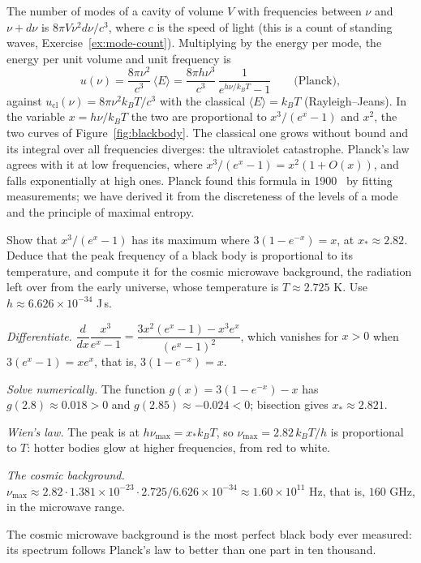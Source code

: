 The number of modes of a cavity of volume $V$ with frequencies between $\nu$ and $\nu+d\nu$ is $8\pi V\nu^2d\nu/c^3$, where $c$ is the speed of light (this is a count of standing waves, Exercise~\ref{ex:mode-count}). Multiplying by the energy per mode, the energy per unit volume and unit frequency is
\[
  u(\nu)=\frac{8\pi\nu^2}{c^3}\,\langle E\rangle=\frac{8\pi h\nu^3}{c^3}\,\frac1{e^{h\nu/k_BT}-1}\qquad\text{(Planck)},
\]
against $u_{\mathrm{cl}}(\nu)=8\pi\nu^2k_BT/c^3$ with the classical $\langle E\rangle=k_BT$ (Rayleigh--Jeans). In the variable $x=h\nu/k_BT$ the two are proportional to $x^3/(e^x-1)$ and $x^2$, the two curves of Figure~\ref{fig:blackbody}. The classical one grows without bound and its integral over all frequencies diverges: the ultraviolet catastrophe. Planck's law agrees with it at low frequencies, where $x^3/(e^x-1)=x^2(1+O(x))$, and falls exponentially at high ones. Planck found this formula in 1900~\cite{planck1901} by fitting measurements; we have derived it from the discreteness of the levels of a mode and the principle of maximal entropy.

\begin{example}\label{ex:wien}
  Show that $x^3/(e^x-1)$ has its maximum where $3(1-e^{-x})=x$, at $x_*\approx2.82$. Deduce that the peak frequency of a black body is proportional to its temperature, and compute it for the cosmic microwave background, the radiation left over from the early universe, whose temperature is $T\approx2.725$ K. Use $h\approx6.626\times10^{-34}$ J\,s.
\end{example}
\begin{solution}
  \begin{steps}
    \item \emph{Differentiate.} $\dfrac{d}{dx}\dfrac{x^3}{e^x-1}=\dfrac{3x^2(e^x-1)-x^3e^x}{(e^x-1)^2}$, which vanishes for $x>0$ when $3(e^x-1)=xe^x$, that is, $3(1-e^{-x})=x$.
    \item \emph{Solve numerically.} The function $g(x)=3(1-e^{-x})-x$ has $g(2.8)\approx0.018>0$ and $g(2.85)\approx-0.024<0$; bisection gives $x_*\approx2.821$.
    \item \emph{Wien's law.} The peak is at $h\nu_{\max}=x_*k_BT$, so $\nu_{\max}=2.82\,k_BT/h$ is proportional to $T$: hotter bodies glow at higher frequencies, from red to white.
    \item \emph{The cosmic background.} $\nu_{\max}\approx2.82\cdot1.381\times10^{-23}\cdot2.725/6.626\times10^{-34}\approx1.60\times10^{11}$ Hz, that is, $160$ GHz, in the microwave range.
  \end{steps}
  The cosmic microwave background is the most perfect black body ever measured: its spectrum follows Planck's law to better than one part in ten thousand.
\end{solution}

